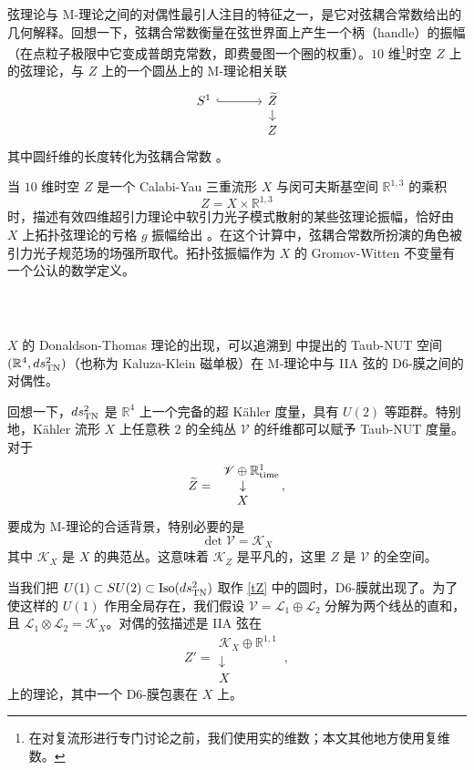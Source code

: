 \documentclass[12pt]{article}
\newcommand{\R}{\mathbb{R}}
\newcommand{\cL}{\mathscr{L}}
\newcommand{\cV}{\mathscr{V}}
\newcommand{\cK}{\mathscr{K}}
\theoremstyle{definition}
\begin{document}
弦理论与 M-理论之间的对偶性最引人注目的特征之一，是它对弦耦合常数给出的几何解释。回想一下，弦耦合常数衡量在弦世界面上产生一个柄（handle）的振幅（在点粒子极限中它变成普朗克常数，即费曼图一个圈的权重）。$10$ 维\footnote{在对复流形进行专门讨论之前，我们使用实的维数；本文其他地方使用复维数。}时空 $Z$ 上的弦理论，与 $Z$ 上的一个圆丛上的 M-理论相关联
\begin{equation}
  \begin{tikzcd}[row sep=small,column sep=large]
  S^1 \arrow[r,hook] & \widetilde{Z} \arrow[d] \\
  & Z
  \end{tikzcd}\label{tZ}
\end{equation}
其中圆纤维的长度转化为弦耦合常数 \cite{Witten:1995ex}。

当 $10$ 维时空 $Z$ 是一个 Calabi-Yau 三重流形 $X$ 与闵可夫斯基空间 ${\R}^{1,3}$ 的乘积
$$
Z = X \times {\R}^{1,3}
$$
时，描述有效四维超引力理论中软引力光子模式散射的某些弦理论振幅，恰好由 $X$ 上拓扑弦理论的亏格 $g$ 振幅给出 \cite{Bershadsky:1993cx,
  Antoniadis:1993ze}。在这个计算中，弦耦合常数所扮演的角色被引力光子规范场的场强所取代。拓扑弦振幅作为 $X$ 的 Gromov-Witten 不变量有一个公认的数学定义。

\subsubsection{\ }

$X$ 的 Donaldson-Thomas 理论的出现，可以追溯到 \cite{Hull:1997kt,Sen:1997js} 中提出的 Taub-NUT 空间 $(\R^4, ds_{\textup{TN}}^2)$（也称为 Kaluza-Klein 磁单极）在 M-理论中与 IIA 弦的 D6-膜之间的对偶性。

回想一下，$ds_{\textup{TN}}^2$ 是 $\R^4$ 上一个完备的超 Kähler 度量，具有 $U(2)$ 等距群。特别地，Kähler 流形 $X$ 上任意秩 $2$ 的全纯丛 $\cV$ 的纤维都可以赋予 Taub-NUT 度量。对于
\begin{equation}
\widetilde{Z} = \!\!\!\!
\begin{matrix}
\quad\,\, \cV \oplus  \R^1_{\textup{time}} \\
\downarrow\\
X
\end{matrix} \,,\label{tZ2}
\end{equation}
要成为 M-理论的合适背景，特别必要的是
$$
\det \cV = \cK_X
$$
其中 $\cK_X$ 是 $X$ 的典范丛。这意味着 $\cK_Z$ 是平凡的，这里 $Z$ 是 $\cV$ 的全空间。

当我们把 $U(1) \subset SU(2) \subset
\textup{Iso}(ds_{\textup{TN}}^2)$ 取作 \eqref{tZ} 中的圆时，D6-膜就出现了。为了使这样的 $U(1)$ 作用全局存在，我们假设 $\cV = \cL_1 \oplus \cL_2$ 分解为两个线丛的直和，且 $\cL_1 \otimes \cL_2 = \cK_X$。对偶的弦描述是 IIA 弦在
$$
Z' =
\begin{matrix}
\cK_X \oplus \R^{1,1}  \\
\downarrow\\
X
\end{matrix} \,,
$$
上的理论，其中一个 D6-膜包裹在 $X$ 上。
\end{document}
